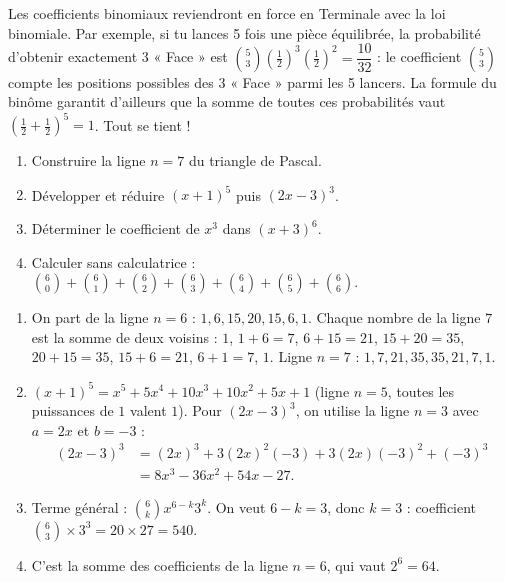 \documentclass[11pt]{article}
\newcommand{\cle}[1]{{\popxbold\color{popdark}#1}}
\begin{document}
\begin{savaistu}
Les coefficients binomiaux reviendront en force en Terminale avec la \cle{loi binomiale}. Par exemple, si tu lances 5 fois une pièce équilibrée, la probabilité d'obtenir exactement 3 « Face » est $\binom{5}{3}\left(\tfrac{1}{2}\right)^3\left(\tfrac{1}{2}\right)^2 = \dfrac{10}{32}$ : le coefficient $\binom{5}{3}$ compte les positions possibles des 3 « Face » parmi les 5 lancers. La formule du binôme garantit d'ailleurs que la somme de toutes ces probabilités vaut $\left(\tfrac12 + \tfrac12\right)^5 = 1$. Tout se tient !
\end{savaistu}

\begin{exercice}
\begin{enumerate}
\item Construire la ligne $n=7$ du triangle de Pascal.
\item Développer et réduire $(x+1)^5$ puis $(2x-3)^3$.
\item Déterminer le coefficient de $x^3$ dans $(x+3)^6$.
\item Calculer sans calculatrice : $\binom{6}{0} + \binom{6}{1} + \binom{6}{2} + \binom{6}{3} + \binom{6}{4} + \binom{6}{5} + \binom{6}{6}$.
\end{enumerate}
\end{exercice}

\begin{corrige}[Exercice]
\begin{enumerate}
\item On part de la ligne $n=6$ : $1, 6, 15, 20, 15, 6, 1$. Chaque nombre de la ligne $7$ est la somme de deux voisins : $1$, $1+6=7$, $6+15=21$, $15+20=35$, $20+15=35$, $15+6=21$, $6+1=7$, $1$. Ligne $n=7$ : $1, 7, 21, 35, 35, 21, 7, 1$.
\item $(x+1)^5 = x^5 + 5x^4 + 10x^3 + 10x^2 + 5x + 1$ (ligne $n=5$, toutes les puissances de $1$ valent $1$).
Pour $(2x-3)^3$, on utilise la ligne $n=3$ avec $a=2x$ et $b=-3$ :
\begin{align*}
(2x-3)^3 &= (2x)^3 + 3(2x)^2(-3) + 3(2x)(-3)^2 + (-3)^3 \\
&= 8x^3 - 36x^2 + 54x - 27.
\end{align*}
\item Terme général : $\binom{6}{k} x^{6-k} 3^k$. On veut $6-k = 3$, donc $k=3$ : coefficient $\binom{6}{3} \times 3^3 = 20 \times 27 = 540$.
\item C'est la somme des coefficients de la ligne $n=6$, qui vaut $2^6 = 64$.
\end{enumerate}
\end{corrige}
\end{document}
